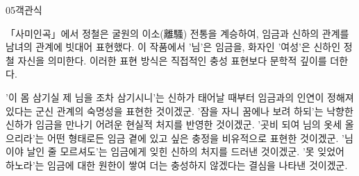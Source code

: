 \documentclass[fs85,seriesWit]{korfarm-base}
\begin{document}
\begin{kfQBlock}{05}{객관식}
\begin{kfEvidence}「사미인곡」에서 정철은 굴원의 이소(離騷) 전통을 계승하여, 임금과 신하의 관계를 남녀의 관계에 빗대어 표현했다. 이 작품에서 '님'은 임금을, 화자인 '여성'은 신하인 정철 자신을 의미한다. 이러한 표현 방식은 직접적인 충성 표현보다 문학적 깊이를 더한다.\end{kfEvidence}
\begin{kfChoices}
\kfChoice '이 몸 삼기실 제 님을 조차 삼기시니'는 신하가 태어날 때부터 임금과의 인연이 정해져 있다는 군신 관계의 숙명성을 표현한 것이겠군.
\kfChoice '잠을 자니 꿈에나 보려 하되'는 낙향한 신하가 임금을 만나기 어려운 현실적 처지를 반영한 것이겠군.
\kfChoice '곳비 되여 님의 옷세 올으리라'는 어떤 형태로든 임금 곁에 있고 싶은 충정을 비유적으로 표현한 것이겠군.
\kfChoice '님이야 날인 줄 모르셔도'는 임금에게 잊힌 신하의 처지를 드러낸 것이겠군.
\kfChoice '못 잊었어 하노라'는 임금에 대한 원한이 쌓여 더는 충성하지 않겠다는 결심을 나타낸 것이겠군.
\end{kfChoices}
\end{kfQBlock}

\kfEndMC
\end{document}
